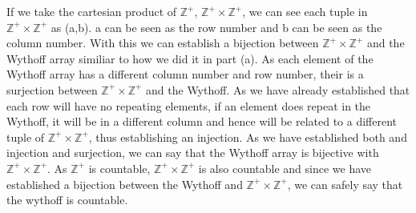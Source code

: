 \documentclass[addpoints]{exam}
\begin{document}
\begin{questions}
\begin{parts}
\begin{solution}
    If we take the cartesian product of $\mathbb{Z^+}$, $\mathbb{Z^+} \times \mathbb{Z^+}$, we can see each tuple in $\mathbb{Z^+} \times \mathbb{Z^+}$ as (a,b). a can be seen as the row number and b can be seen as the column number. With this we can establish a bijection between $\mathbb{Z^+} \times \mathbb{Z^+}$ and the Wythoff array similiar to how we did it in part (a). As each element of the Wythoff array has a different column number and row number, their is a surjection between $\mathbb{Z^+} \times \mathbb{Z^+}$ and the Wythoff. As we have already established that each row will have no repeating elements, if an element does repeat in the Wythoff, it will be in a different column and hence will be related to a different tuple of $\mathbb{Z^+} \times \mathbb{Z^+}$, thus establishing an injection. As we have established both and injection and surjection, we can say that the Wythoff array is bijective with \textbf{$\mathbb{Z^+} \times \mathbb{Z^+}$}. As $\mathbb{Z^+}$ is countable, $\mathbb{Z^+} \times \mathbb{Z^+}$ is also countable and since we have established a bijection between the Wythoff and $\mathbb{Z^+} \times \mathbb{Z^+}$, we can safely say that the wythoff is countable.
  \end{solution}
\end{parts}

\end{questions}
\end{document}

